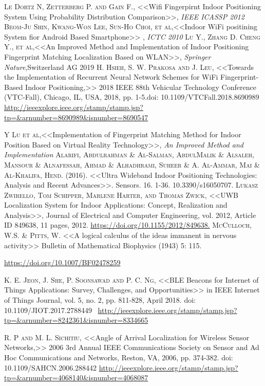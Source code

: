 \documentclass[12pt]{report}
\begin{document}
\begin{thebibliography}{X}
 \textsc{Le Dortz N, Zetterberg P. and Gain F.}, <<Wifi Fingerpirnt Indoor Positioning System Using Probability Distribution Comparison>>, \textit{IEEE ICASSP 2012}
 \textsc{Beom-Ju Shin, Kwang-Won Lee, Sun-Ho Choi, et al},<<Indoor WiFi positining System fior Android Based Smartphone>> , \textit{ICTC 2010}
 \textsc{Lu Y., Zhang D. Cheng Y., et al},<<An Improved Method and Implementation of Indoor Positioning Fingerprint Matching Localization Based on WLAN>>, \textit{Springer Nature},Switzerland AG 2019
\textsc{H. Hsieh, S. W. Prakosa and J. Leu}, <<Towards the Implementation of Recurrent Neural Network Schemes for WiFi Fingerprint-Based Indoor Positioning,>> 2018 IEEE 88th Vehicular Technology Conference (VTC-Fall), Chicago, IL, USA, 2018, pp. 1-5.doi: 10.1109/VTCFall.2018.8690989
\url{http://ieeexplore.ieee.org/stamp/stamp.jsp?tp=&arnumber=8690989&isnumber=8690547}

 \textsc{Y Lu et al},<<Implementation of Fingerprint Matching Method for Indoor Position Based on Virtual Reality Technology>>, \textit{An Improved Method and Implementation}
 \textsc{Alarifi, Abdulrahman \& Al-Salman, AbdulMalik \& Alsaleh, Mansour \& Alnafessah, Ahmad \& Alhadhrami, Suheer \& A. Al-Ammar, Mai \& Al-Khalifa, Hend}. (2016). <<Ultra Wideband Indoor Positioning Technologies: Analysis and Recent Advances>>. Sensors. 16. 1-36. 10.3390/s16050707.
 \textsc{Lukasz Zwirello, Tom Schipper, Marlene Harter, and Thomas Zwick}, <<UWB Localization System for Indoor Applications: Concept, Realization and Analysis>>, Journal of Electrical and Computer Engineering, vol. 2012, Article ID 849638, 11 pages, 2012. \url{https://doi.org/10.1155/2012/849638.}
\textsc{McCulloch, W.S. \& Pitts, W.} <<A logical calculus of the ideas immanent in nervous activity>> Bulletin of Mathematical Biophysics (1943) 5: 115. 

\url{https://doi.org/10.1007/BF02478259}

 \textsc{K. E. Jeon, J. She, P. Soonsawad and P. C. Ng}, <<BLE Beacons for Internet of Things Applications: Survey, Challenges, and Opportunities>> in IEEE Internet of Things Journal, vol. 5, no. 2, pp. 811-828, April 2018. doi: 10.1109/JIOT.2017.2788449 \ \url{http://ieeexplore.ieee.org/stamp/stamp.jsp?tp=&arnumber=8242361&isnumber=8334665}

 \textsc{R. P and M. L. Sichitiu}, <<Angle of Arrival Localization for Wireless Sensor Networks,>> 2006 3rd Annual IEEE Communications Society on Sensor and Ad Hoc Communications and Networks, Reston, VA, 2006, pp. 374-382. doi: 10.1109/SAHCN.2006.288442
\url{http://ieeexplore.ieee.org/stamp/stamp.jsp?tp=&arnumber=4068140&isnumber=4068087}


\end{thebibliography}
\end{document}
